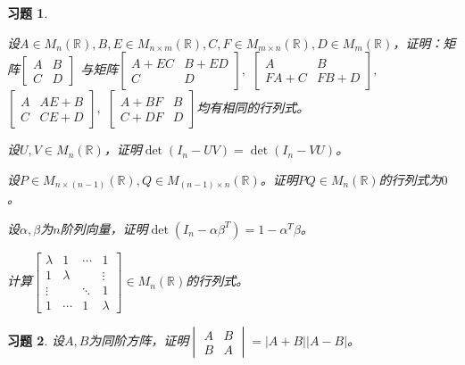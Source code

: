 \documentclass[a4paper]{book}
\newtheorem{ex}{习题}[chapter]
\newcommand{\enum}{\begin{list}{}{\setlength{\leftmargin}{0pt} \setlength{\itemindent}{2.5em} \setlength{\listparindent}{2em}}}
\begin{document}
\begin{ex}\  \label{ex:3.8}

\enum
\item[(1)] 设$A\in M_n(\mathbb{R}), B, E\in M_{n\times m}(\mathbb{R}), C, F\in M_{m\times n}(\mathbb{R}), D\in M_m(\mathbb{R})$，证明：矩阵$\begin{bmatrix} A & B \\ C & D \end{bmatrix}$ 与矩阵$\begin{bmatrix} A + EC & B + ED \\ C & D \end{bmatrix},$ $\begin{bmatrix} A & B \\ FA + C & FB + D \end{bmatrix},$ $\begin{bmatrix} A & AE + B \\ C & CE + D \end{bmatrix},$ $\begin{bmatrix} A + BF & B \\ C + DF & D \end{bmatrix}$均有相同的行列式。

\item[(2)] 设$U,V\in M_n(\mathbb{R})$，证明$\det(I_n - UV) = \det(I_n-VU)$。

\item[(3)] 设$P\in M_{n\times (n-1)}(\mathbb{R}), Q\in M_{(n - 1)\times n}(\mathbb{R})$。证明$PQ \in M_n(\mathbb{R})$的行列式为$0$。

\item[(4)] 设$\alpha, \beta$为$n$阶列向量，证明$\det(I_n - \alpha\beta^T) = 1 - \alpha^T\beta$。

\item[(5)] 计算$\begin{bmatrix} \lambda & 1 & \cdots & 1 \\ 1 & \lambda & & \vdots \\ \vdots & & \ddots & 1 \\ 1 & \cdots & 1 & \lambda \end{bmatrix} \in M_n(\mathbb{R})$的行列式。
\end{list}
\end{ex}

\begin{ex} \label{ex:3.9}
设$A, B$为同阶方阵，证明$\begin{vmatrix} A & B \\ B & A \end{vmatrix} = |A + B||A - B|$。
\end{ex}
\end{document}
